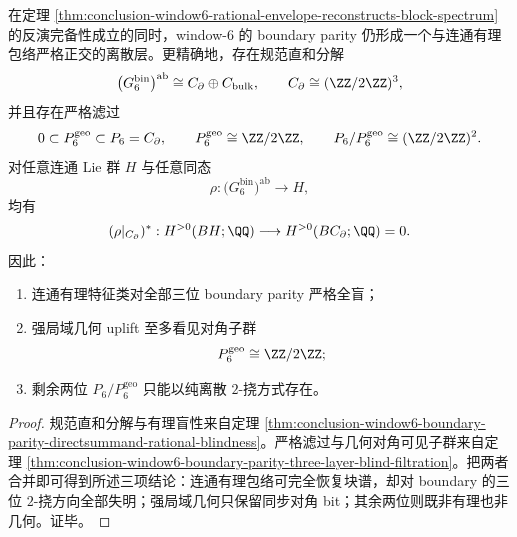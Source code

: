 \begin{theorem}\label{thm:conclusion-window6-rational-completeness-with-boundary-torsion-blindness}
在定理 \ref{thm:conclusion-window6-rational-envelope-reconstructs-block-spectrum} 的反演完备性成立的同时，window-\(6\) 的 boundary parity 仍形成一个与连通有理包络严格正交的离散层。更精确地，存在规范直和分解
\[
\bigl(G_6^{\mathrm{bin}}\bigr)^{\mathrm{ab}}
\cong
C_{\partial}\oplus C_{\mathrm{bulk}},
\qquad
C_{\partial}\cong (\ZZ/2\ZZ)^3,
\]
并且存在严格滤过
\[
0\subset P_6^{\mathrm{geo}}\subset P_6=C_{\partial},
\qquad
P_6^{\mathrm{geo}}\cong \ZZ/2\ZZ,
\qquad
P_6/P_6^{\mathrm{geo}}\cong (\ZZ/2\ZZ)^2.
\]
对任意连通 Lie 群 \(H\) 与任意同态
\[
\rho:\bigl(G_6^{\mathrm{bin}}\bigr)^{\mathrm{ab}}\to H,
\]
均有
\[
(\rho|_{C_{\partial}})^\ast:
H^{>0}(BH;\QQ)\longrightarrow H^{>0}(BC_{\partial};\QQ)=0.
\]
因此：
\begin{enumerate}
\normalfont
  \item 连通有理特征类对全部三位 boundary parity 严格全盲；
  \item 强局域几何 uplift 至多看见对角子群
  \[
  P_6^{\mathrm{geo}}\cong \ZZ/2\ZZ;
  \]
  \item 剩余两位 \(P_6/P_6^{\mathrm{geo}}\) 只能以纯离散 \(2\)-挠方式存在。
\end{enumerate}
\end{theorem}
\begin{proof}
规范直和分解与有理盲性来自定理 \ref{thm:conclusion-window6-boundary-parity-directsummand-rational-blindness}。严格滤过与几何对角可见子群来自定理 \ref{thm:conclusion-window6-boundary-parity-three-layer-blind-filtration}。把两者合并即可得到所述三项结论：连通有理包络可完全恢复块谱，却对 boundary 的三位 \(2\)-挠方向全部失明；强局域几何只保留同步对角 bit；其余两位则既非有理也非几何。证毕。
\end{proof}

